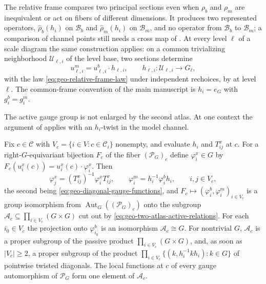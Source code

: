 The relative frame compares two principal sections even when \(\rho_b\) and \(\rho_m\) are
inequivalent or act on fibers of different dimensions. It produces two represented operators,
\(\widehat\rho_b(h_i)\) on \(\mathcal B_b\) and \(\widehat\rho_m(h_i)\) on \(\mathcal B_m\), and no
operator from \(\mathcal B_b\) to \(\mathcal B_m\); a comparison of channel points still needs a
cross map of . At every level \(\ell\) of a scale diagram the same
construction applies: on a common trivializing neighborhood \(\mathcal U_{\ell,i}\) of the level
base, two sections determine
\begin{equation}
u_{\ell,i}^m=u_{\ell,i}^b\cdot h_{\ell,i},
\qquad
h_{\ell,i}:\mathcal U_{\ell,i}\longrightarrow G_\ell,
\label{eq:rg-relative-frame}
\end{equation}
with the law \eqref{eq:geo-relative-frame-law} under independent rechoices, by
 at level \(\ell\). The common-frame
convention of the main manuscript is \(h_i=e_G\) with \(g_i^b=g_i^m\).

The active gauge group is not enlarged by the second atlas. At one context the argument of
 applies with an \(h_i\)-twist in the model channel.

Fix \(c\in\mathcal C\) with \(V_c=\{i\in V:c\in\mathcal C_i\}\) nonempty, and evaluate \(h_i\) and
\(T_{ij}^x\) at \(c\). For a right-\(G\)-equivariant bijection \(F_c\) of the fiber
\((\mathscr P_G)_c\) define \(\varphi_i^x\in G\) by
\(F_c(u_i^x(c))=u_i^x(c)\cdot\varphi_i^x\). Then
\begin{equation}
\varphi_j^x=(T_{ij}^x)^{-1}\varphi_i^xT_{ij}^x,
\qquad
\varphi_i^m=h_i^{-1}\varphi_i^bh_i,
\qquad i,j\in V_c,
\label{eq:geo-two-atlas-active-relations}
\end{equation}
the second being \eqref{eq:geo-diagonal-gauge-functions}, and
\(F_c\mapsto(\varphi_i^b,\varphi_i^m)_{i\in V_c}\) is a group isomorphism from
\(\operatorname{Aut}_G((\mathscr P_G)_c)\) onto the subgroup
\(\mathcal A_c\subseteq\prod_{i\in V_c}(G\times G)\) cut out by
\eqref{eq:geo-two-atlas-active-relations}. For each \(i_0\in V_c\) the projection onto
\(\varphi_{i_0}^b\) is an isomorphism \(\mathcal A_c\cong G\). For nontrivial \(G\),
\(\mathcal A_c\) is a proper subgroup of the passive product \(\prod_{i\in V_c}(G\times G)\), and,
as soon as \(|V_c|\geq2\), a proper subgroup of the product
\(\prod_{i\in V_c}\{(k,h_i^{-1}kh_i):k\in G\}\) of pointwise twisted diagonals. The local functions
at \(c\) of every gauge automorphism of \(\mathscr P_G\) form one element of \(\mathcal A_c\).

